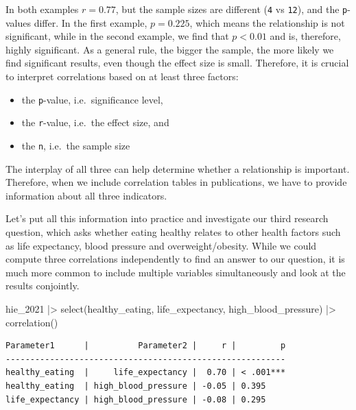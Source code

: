 \documentclass[
  letterpaper,
]{krantz}
\makeatletter
\newenvironment{Shaded}{\begin{snugshade}}{\end{snugshade}}
\newcommand{\FunctionTok}[1]{\textcolor[rgb]{0.28,0.35,0.67}{#1}}
\newcommand{\NormalTok}[1]{\textcolor[rgb]{0.00,0.23,0.31}{#1}}
\newcommand{\SpecialCharTok}[1]{\textcolor[rgb]{0.37,0.37,0.37}{#1}}
\newenvironment{kframe}{%
\medskip{}
\setlength{\fboxsep}{.8em}
 \def\at@end@of@kframe{}%
 \ifinner\ifhmode%
  \def\at@end@of@kframe{\end{minipage}}%
  \begin{minipage}{\columnwidth}%
 \fi\fi%
 \def\FrameCommand##1{\hskip\@totalleftmargin \hskip-\fboxsep
 \colorbox{shadecolor}{##1}\hskip-\fboxsep
     \hskip-\linewidth \hskip-\@totalleftmargin \hskip\columnwidth}%
 \MakeFramed {\advance\hsize-\width
   \@totalleftmargin\z@ \linewidth\hsize
   \@setminipage}}%
 {\par\unskip\endMakeFramed%
 \at@end@of@kframe}
\renewenvironment{Shaded}{\begin{kframe}}{\end{kframe}}
\makeatother
\begin{document}
In both examples \(r = 0.77\), but the sample sizes are different
(\texttt{4} vs \texttt{12}), and the \texttt{p}-values differ. In the
first example, \(p = 0.225\), which means the relationship is not
significant, while in the second example, we find that \(p < 0.01\) and
is, therefore, highly significant. As a general rule, the bigger the
sample, the more likely we find significant results, even though the
effect size is small. Therefore, it is crucial to interpret correlations
based on at least three factors:

\begin{itemize}
\item
  the \texttt{p}-value, i.e.~significance level,
\item
  the \texttt{r}-value, i.e.~the effect size, and
\item
  the \texttt{n}, i.e.~the sample size
\end{itemize}

The interplay of all three can help determine whether a relationship is
important. Therefore, when we include correlation tables in
publications, we have to provide information about all three indicators.

Let's put all this information into practice and investigate our third
research question, which asks whether eating healthy relates to other
health factors such as life expectancy, blood pressure and
overweight/obesity. While we could compute three correlations
independently to find an answer to our question, it is much more common
to include multiple variables simultaneously and look at the results
conjointly.

\begin{Shaded}
\begin{Highlighting}[]
\NormalTok{hie\_2021 }\SpecialCharTok{|\textgreater{}}
  \FunctionTok{select}\NormalTok{(healthy\_eating, life\_expectancy, high\_blood\_pressure) }\SpecialCharTok{|\textgreater{}}
  \FunctionTok{correlation}\NormalTok{()}
\end{Highlighting}
\end{Shaded}

\begin{verbatim}
Parameter1      |          Parameter2 |     r |         p
---------------------------------------------------------
healthy_eating  |     life_expectancy |  0.70 | < .001***
healthy_eating  | high_blood_pressure | -0.05 | 0.395    
life_expectancy | high_blood_pressure | -0.08 | 0.295    
\end{verbatim}
\end{document}
